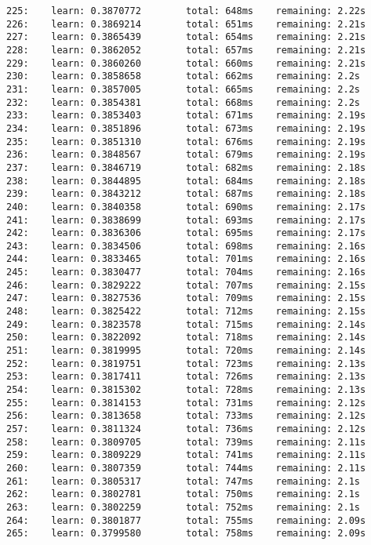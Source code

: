 \documentclass[11pt]{article}
\begin{document}
\begin{Verbatim}[commandchars=\\\{\}]
225:    learn: 0.3870772        total: 648ms    remaining: 2.22s
226:    learn: 0.3869214        total: 651ms    remaining: 2.21s
227:    learn: 0.3865439        total: 654ms    remaining: 2.21s
228:    learn: 0.3862052        total: 657ms    remaining: 2.21s
229:    learn: 0.3860260        total: 660ms    remaining: 2.21s
230:    learn: 0.3858658        total: 662ms    remaining: 2.2s
231:    learn: 0.3857005        total: 665ms    remaining: 2.2s
232:    learn: 0.3854381        total: 668ms    remaining: 2.2s
233:    learn: 0.3853403        total: 671ms    remaining: 2.19s
234:    learn: 0.3851896        total: 673ms    remaining: 2.19s
235:    learn: 0.3851310        total: 676ms    remaining: 2.19s
236:    learn: 0.3848567        total: 679ms    remaining: 2.19s
237:    learn: 0.3846719        total: 682ms    remaining: 2.18s
238:    learn: 0.3844895        total: 684ms    remaining: 2.18s
239:    learn: 0.3843212        total: 687ms    remaining: 2.18s
240:    learn: 0.3840358        total: 690ms    remaining: 2.17s
241:    learn: 0.3838699        total: 693ms    remaining: 2.17s
242:    learn: 0.3836306        total: 695ms    remaining: 2.17s
243:    learn: 0.3834506        total: 698ms    remaining: 2.16s
244:    learn: 0.3833465        total: 701ms    remaining: 2.16s
245:    learn: 0.3830477        total: 704ms    remaining: 2.16s
246:    learn: 0.3829222        total: 707ms    remaining: 2.15s
247:    learn: 0.3827536        total: 709ms    remaining: 2.15s
248:    learn: 0.3825422        total: 712ms    remaining: 2.15s
249:    learn: 0.3823578        total: 715ms    remaining: 2.14s
250:    learn: 0.3822092        total: 718ms    remaining: 2.14s
251:    learn: 0.3819995        total: 720ms    remaining: 2.14s
252:    learn: 0.3819751        total: 723ms    remaining: 2.13s
253:    learn: 0.3817411        total: 726ms    remaining: 2.13s
254:    learn: 0.3815302        total: 728ms    remaining: 2.13s
255:    learn: 0.3814153        total: 731ms    remaining: 2.12s
256:    learn: 0.3813658        total: 733ms    remaining: 2.12s
257:    learn: 0.3811324        total: 736ms    remaining: 2.12s
258:    learn: 0.3809705        total: 739ms    remaining: 2.11s
259:    learn: 0.3809229        total: 741ms    remaining: 2.11s
260:    learn: 0.3807359        total: 744ms    remaining: 2.11s
261:    learn: 0.3805317        total: 747ms    remaining: 2.1s
262:    learn: 0.3802781        total: 750ms    remaining: 2.1s
263:    learn: 0.3802259        total: 752ms    remaining: 2.1s
264:    learn: 0.3801877        total: 755ms    remaining: 2.09s
265:    learn: 0.3799580        total: 758ms    remaining: 2.09s

\end{Verbatim}
\end{document}
